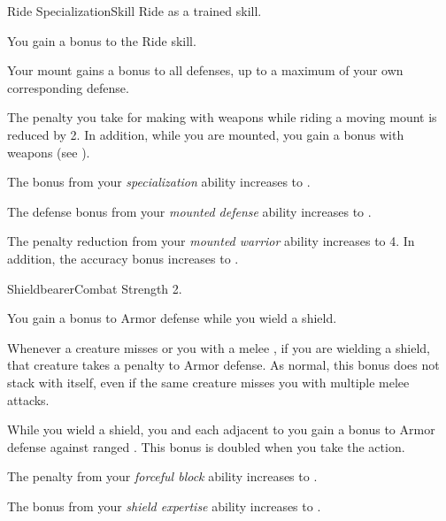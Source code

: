     \begin{feat}{Ride Specialization}{Skill}
        \featpre Ride as a trained skill.

         You gain a  bonus to the Ride skill.

         Your mount gains a  bonus to all defenses, up to a maximum of your own corresponding defense.

         The penalty you take for making  with  weapons while riding a moving mount is reduced by 2.
        In addition, while you are mounted, you gain a   bonus with  weapons (see ).

         The bonus from your \textit{specialization} ability increases to .

         The defense bonus from your \textit{mounted defense} ability increases to .

         The penalty reduction from your \textit{mounted warrior} ability increases to 4.
        In addition, the accuracy bonus increases to .
    \end{feat}

    \begin{feat}{Shieldbearer}{Combat}
        \featpre Strength 2.

         You gain a  bonus to Armor defense while you wield a shield.

         Whenever a creature misses or  you with a melee , if you are wielding a shield, that creature  takes a  penalty to Armor defense.
        As normal, this bonus does not stack with itself, even if the same creature misses you with multiple melee attacks.

         While you wield a shield, you and each  adjacent to you gain a  bonus to Armor defense against ranged .
        This bonus is doubled when you take the  action.

         The penalty from your \textit{forceful block} ability increases to .

         The bonus from your \textit{shield expertise} ability increases to .
    \end{feat}

